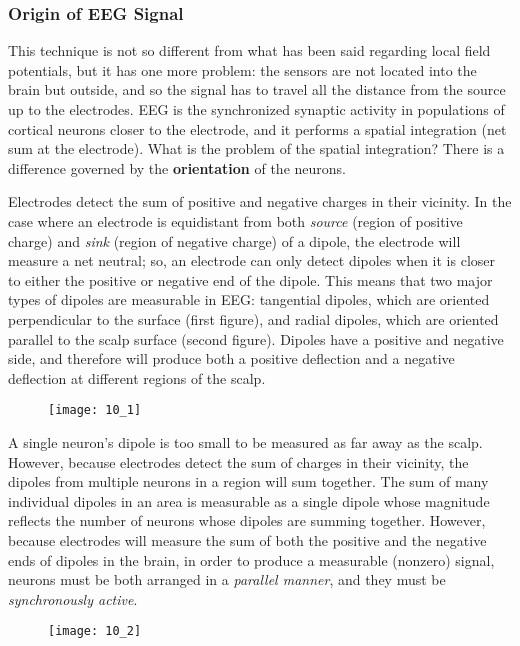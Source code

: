 \subsubsection{Origin of EEG Signal}
This technique is not so different from what has been said regarding local field potentials, but it has one more 
problem: the sensors are not located into the brain but outside, and so the signal has to travel all the distance 
from the source up to the electrodes. EEG is the synchronized synaptic activity in populations of cortical neurons 
closer to the electrode, and it performs a spatial integration (net sum at the electrode).
What is the problem of the spatial integration? There is a difference governed by the \textbf{orientation} of the neurons.
\par\medskip
Electrodes detect the sum of positive and negative charges in their vicinity. In the case where an electrode is 
equidistant from both \textit{source} (region of positive charge) and \textit{sink} (region of negative charge) 
of a dipole, the electrode will measure a net neutral; so, an electrode can only detect dipoles when it is  
closer to either the positive or negative end of the dipole. This means that two major types of dipoles are 
measurable in EEG: tangential dipoles, which are oriented perpendicular to the surface (first figure), and radial 
dipoles, which are oriented parallel to the scalp surface (second figure). Dipoles have a positive and negative side, 
and therefore will produce both a positive deflection and a negative deflection at different regions of the scalp.
\begin{figure}[H]
    \texttt{[image: 10\_1]}
    \centering
\end{figure}
\par\medskip
A single neuron's dipole is too small to be measured as far away as the scalp. However, because electrodes detect the 
sum of charges in their vicinity, the dipoles from multiple neurons in a region will sum together. The sum of many 
individual dipoles in an area is measurable as a single dipole whose magnitude reflects the number of neurons whose 
dipoles are summing together. However, because electrodes will measure the sum of both the positive and the negative 
ends of dipoles in the brain, in order to produce a measurable (nonzero) signal, neurons must be both arranged in a 
\textit{parallel manner}, and they must be \textit{synchronously active}. 
\begin{figure}[H]
    \texttt{[image: 10\_2]}
    \centering
\end{figure}
